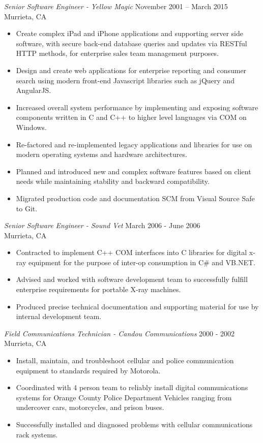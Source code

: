 \documentclass[10pt]{res} %
\begin{document}
\begin{resume}
{\sl Senior Software Engineer - Yellow Magic} \hfill November 2001 -- March 2015 \\
Murrieta, CA 
\begin{itemize} \itemsep -2pt %
\item Create complex iPad and iPhone applications and supporting server side software, with secure back-end database queries and updates via RESTful HTTP methods, for enterprise sales team management purposes.
\item Design and create web applications for enterprise reporting and consumer search using modern front-end Javascript libraries such as jQuery and AngularJS.
\item Increased overall system performance by implementing and exposing software components written in C and C++ to higher level languages via COM on Windows.
\item Re-factored and re-implemented legacy applications and libraries for use on modern operating systems and hardware architectures.
\item Planned and introduced new and complex software features based on client needs while maintaining stability and backward compatibility.
\item Migrated production code and documentation SCM from Visual Source Safe to Git.
\end{itemize}


{\sl Senior Software Engineer - Sound Vet} \hfill March 2006 - June 2006 \\
Murrieta, CA 
\begin{itemize} \itemsep -2pt %
\item Contracted to implement C++ COM interfaces into C libraries for digital x-ray equipment for the purpose of inter-op consumption in C\# and VB.NET.
\item Advised and worked with software development team to successfully fulfill enterprise requirements for portable X-ray machines.
\item Produced precise technical documentation and supporting material for use by internal development team.
\end{itemize}

{\sl Field Communications Technician - Candou Communications} \hfill 2000 - 2002 \\
Murrieta, CA 
\begin{itemize} \itemsep -2pt %
\item Install, maintain, and troubleshoot cellular and police communication equipment to standards required by Motorola.
\item Coordinated with 4 person team to reliably install digital communications systems for Orange County Police Department Vehicles ranging from undercover cars, motorcycles, and prison buses.
\item Successfully installed and diagnosed problems with cellular communications rack systems.
\end{itemize}
 

\end{resume}
\end{document}
